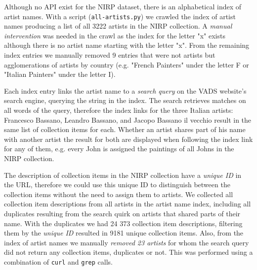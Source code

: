 \documentclass[11pt,a4paper,twoside,openright]{report}
\begin{document}
Although no API exist for the NIRP dataset, there is an alphabetical index of
artist names.  With a script (\texttt{all-artists.py}) we crawled the index of
artist names producing a list of all 3222 artists in the NIRP collection.  A
\emph{manual intervention} was needed in the crawl as the index for the letter
"x" exists although there is no artist name starting with the letter "x".  From
the remaining index entries we manually removed 9 entries that were not artists
but agglomerations of artists by country (e.g. "French Painters" under the
letter F or "Italian Painters" under the letter I).

Each index entry links the artist name to a \emph{search query} on the VADS
website's search engine, querying the string in the index.  The search
retrieves matches on all words of the query, therefore the index links for the
three Italian artists: Francesco Bassano, Leandro Bassano, and Jacopo Bassano
il vecchio result in the same list of collection items for each.  Whether an
artist shares part of his name with another artist the result for both are
displayed when following the index link for any of them, e.g. every John is
assigned the paintings of all Johns in the NIRP collection.

The description of collection items in the NIRP collection have a \emph{unique
ID} in the URL, therefore we could use this unique ID to distinguish between
the collection items without the need to assign them to artists.  We collected
all collection item descriptions from all artists in the artist name index,
including all duplicates resulting from the search quirk on artists that shared
parts of their name.  With the duplicates we had 24 373 collection item
descriptions, filtering them by the \emph{unique ID} resulted in 9181 unique
collection items.  Also, from the index of artist names we manually
\emph{removed 23 artists} for whom the search query did not return any
collection items, duplicates or not.  This was performed using a combination of
\texttt{curl} and \texttt{grep} calls.
\end{document}
